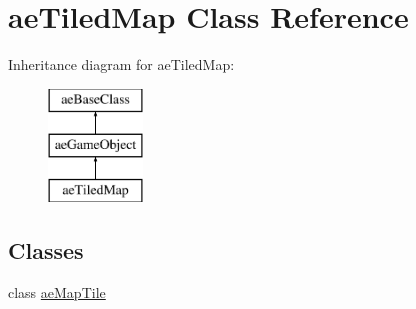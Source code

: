 \hypertarget{classae_tiled_map}{}\section{ae\+Tiled\+Map Class Reference}
\label{classae_tiled_map}
Inheritance diagram for ae\+Tiled\+Map\+:\begin{figure}[H]
\begin{center}
\leavevmode
\includegraphics[height=3.000000cm]{classae_tiled_map}
\end{center}
\end{figure}
\subsection*{Classes}
\begin{DoxyCompactItemize}
\item 
class \hyperlink{classae_tiled_map_1_1ae_map_tile}{ae\+Map\+Tile}
\end{DoxyCompactItemize}
